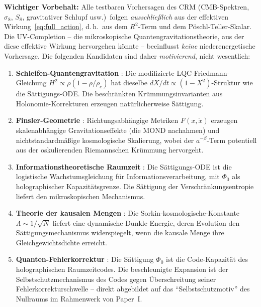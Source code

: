 \documentclass[11pt,a4paper]{article}
\begin{document}
\textbf{Wichtiger Vorbehalt:} Alle testbaren Vorhersagen des CRM (CMB-Spektren, $\sigma_8$, $S_8$, gravitativer Schlupf usw.)\ folgen \textit{ausschlie\ss lich} aus der effektiven Wirkung~\eqref{eq:full_action}, d.\,h.\ aus dem $R^2$-Term und dem P\"oschl-Teller-Skalar. Die UV-Completion -- die mikroskopische Quantengravitationstheorie, aus der diese effektive Wirkung hervorgehen k\"onnte -- beeinflusst \textit{keine} niederenergetische Vorhersage. Die folgenden Kandidaten sind daher \textit{motivierend}, nicht wesentlich:

\begin{enumerate}
\item \textbf{Schleifen-Quantengravitation} \cite{Rovelli2004,Thiemann2007}: Die modifizierte LQC-Friedmann-Gleichung $H^2 \propto \rho(1 - \rho/\rho_c)$ hat dieselbe $dX/dt \propto (1-X^2)$-Struktur wie die S\"attigungs-ODE. Die beschr\"ankten Kr\"ummungsinvarianten aus Holonomie-Korrekturen erzeugen nat\"urlicherweise S\"attigung.

\item \textbf{Finsler-Geometrie} \cite{Bao2000,Girelli2007}: Richtungsabh\"angige Metriken $F(x, \dot{x})$ erzeugen skalenabh\"angige Gravitationseffekte (die MOND nachahmen) und nichtstandardm\"a\ss ige kosmologische Skalierung, wobei der $a^{-\beta}$-Term potentiell aus der oskulierenden Riemannschen Kr\"ummung hervorgeht.

\item \textbf{Informationstheoretische Raumzeit} \cite{Wheeler1990,Bousso2002}: Die S\"attigungs-ODE ist die logistische Wachstumsgleichung f\"ur Informationsverarbeitung, mit $\Phi_0$ als holographischer Kapazit\"atsgrenze. Die S\"attigung der Verschr\"ankungsentropie \cite{VanRaamsdonk2010} liefert den mikroskopischen Mechanismus.

\item \textbf{Theorie der kausalen Mengen} \cite{Bombelli1987}: Die Sorkin-kosmologische-Konstante $\Lambda \sim 1/\sqrt{N}$ liefert eine dynamische Dunkle Energie, deren Evolution den S\"attigungsmechanismus widerspiegelt, wenn die kausale Menge ihre Gleichgewichtsdichte erreicht.

\item \textbf{Quanten-Fehlerkorrektur} \cite{Almheiri2015}: Die S\"attigung $\Phi_0$ ist die Code-Kapazit\"at des holographischen Raumzeitcodes. Die beschleunigte Expansion ist der Selbstschutzmechanismus des Codes gegen \"Uberschreitung seiner Fehlerkorrekturschwelle -- direkt abgebildet auf das "`Selbstschutzmotiv"' des Nullraums im Rahmenwerk von Paper~I.


\end{enumerate}
\end{document}
